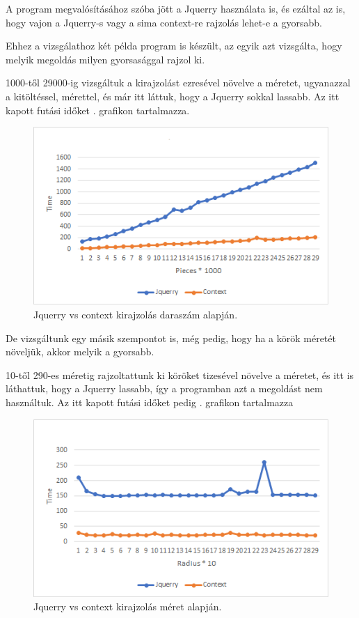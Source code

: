 



A program megvalósításához szóba jött a Jquerry használata is, és ezáltal az is, hogy vajon a Jquerry-s vagy a sima context-re rajzolás lehet-e a gyorsabb.

Ehhez a vizsgálathoz két példa program is készült, az egyik azt vizsgálta, hogy melyik megoldás milyen gyorsasággal rajzol ki. 

1000-től 29000-ig vizsgáltuk a kirajzolást ezresével növelve a méretet, ugyanazzal a kitöltéssel, mérettel, és már itt láttuk, hogy a Jquerry sokkal lassabb. Az itt kapott futási időket . grafikon tartalmazza. 

\begin{figure}[h]
	\centering
	\includegraphics[scale=1]{images/pieces.png}
	\caption{Jquerry vs context kirajzolás daraszám alapján.}
	\label{fig:pieces}
\end{figure}


De vizsgáltunk egy másik szempontot is, még pedig, hogy ha a körök méretét növeljük, akkor melyik a gyorsabb. 

10-től 290-es méretig rajzoltattunk ki köröket tizesével növelve a méretet, és itt is láthattuk, hogy a Jquerry lassabb, így a programban azt a megoldást nem használtuk. Az itt kapott futási időket pedig . grafikon tartalmazza

\begin{figure}[h]
	\centering
	\includegraphics[scale=1]{images/radius.png}
	\caption{Jquerry vs context kirajzolás méret alapján.}
	\label{fig:radius}
\end{figure}

